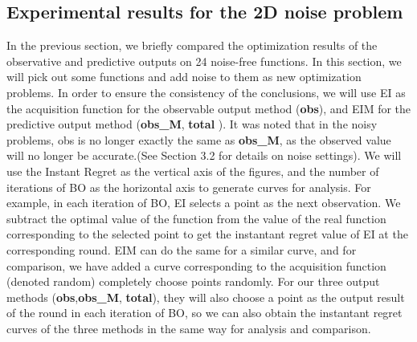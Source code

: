 \documentclass{article}
\begin{document}
  \subsection{Experimental results for the 2D noise problem}
  \hspace{2em}In the previous section, we briefly compared the optimization results of the observative and predictive outputs on 24 noise-free functions. In this section, we will pick out some functions and add noise to them as new optimization problems. In order to ensure the consistency of the conclusions, we will use EI as the acquisition function for the observable output method (\textbf{obs}), and EIM for the predictive output method (\textbf{obs\_M}, \textbf{total} ). It was noted that in the noisy problems, obs is no longer exactly the same as \textbf{obs\_M}, as the observed value will no longer be accurate.(See Section 3.2 for details on noise settings). We will use the Instant Regret as the vertical axis of the figures, and the number of iterations of BO as the horizontal axis to generate curves for analysis. For example, in each iteration of BO, EI selects a point as the next observation. We subtract the optimal value of the function from the value of the real function corresponding to the selected point to get the instantant regret value of EI at the corresponding round. EIM can do the same for a similar curve, and for comparison, we have added a curve corresponding to the acquisition function (denoted random) completely choose points randomly. For our three output methods (\textbf{obs},\textbf{obs\_M}, \textbf{total}), they will also choose a point as the output result of the round in each iteration of BO, so we can also obtain the instantant regret curves of the three methods in the same way for analysis and comparison.
  
\end{document}
